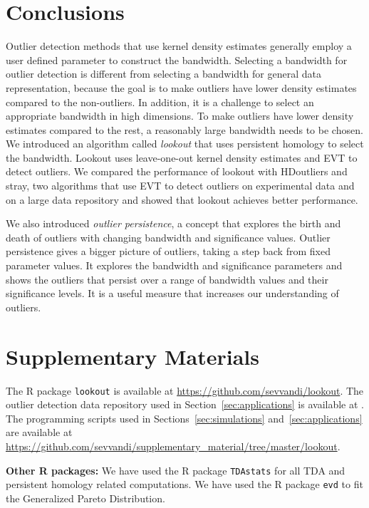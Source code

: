 \documentclass[letter,12pt]{article}
\begin{document}
\section{Conclusions}\label{sec:conclusions}
Outlier detection methods that use kernel density estimates generally employ a user defined parameter to construct the bandwidth. Selecting a bandwidth for outlier detection is different from selecting a bandwidth for general data representation, because the goal is to make outliers have lower density estimates compared to the non-outliers. In addition, it is a challenge to select an appropriate bandwidth in high dimensions. To make outliers have lower density estimates compared to the rest, a reasonably large bandwidth needs to be chosen. We introduced an algorithm called \textit{lookout} that uses  persistent homology to select the bandwidth. Lookout uses leave-one-out kernel density estimates and EVT to detect outliers. We compared the performance of lookout with HDoutliers and stray, two algorithms that use EVT to detect outliers on experimental data and  on a large data repository and showed that lookout achieves better performance. 


We also introduced \textit{outlier persistence}, a concept that explores the birth and death of outliers with changing bandwidth and significance values.  Outlier persistence gives a bigger picture of outliers, taking a step back from fixed parameter values. It explores the bandwidth and significance parameters and shows the outliers that persist over a range of bandwidth values and their significance levels. It is a useful measure that increases our understanding of outliers.  %



\section{Supplementary Materials}\label{sec:suppmat}
The R package \texttt{lookout} is available at  \url{https://github.com/sevvandi/lookout}. 
The outlier detection data repository used in Section~\ref{sec:applications} is available at \cite{datasets}. %
The programming scripts used in Sections~\ref{sec:simulations} and~\ref{sec:applications}  are available at \\ \url{https://github.com/sevvandi/supplementary_material/tree/master/lookout}. 

\textbf{Other R packages:} We have used the R package \texttt{TDAstats} \citep{tdastatsR} for all TDA and persistent homology related computations. We have used the R package \texttt{evd} \citep{evdR} to fit the Generalized Pareto Distribution. 

 
\end{document}
